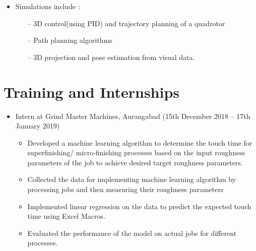 \documentclass[margin,line]{res}
\begin{document}
\begin{resume}
\begin{enumerate}
\begin{itemize}
		\item Simulations include :
		\begin{itemize}
			\item[--] 3D control(using PID) and trajectory planning of a quadrotor
			\item[--] Path planning algorithms 
			\item[--] 3D projection and pose estimation from visual data.
		\end{itemize}
	\end{itemize}
\end{enumerate}

\section{\sc Training and Internships}
\begin{itemize}
\item Intern at Grind Master Machines, Aurangabad (15th December 2018 – 17th January 2019)
\begin{itemize}
	\item Developed a machine learning algorithm to determine the touch time for superfinishing/ micro-finishing processes based 				on the input roughness parameters of the job to achieve desired target roughness parameters.
	\item Collected the data for implementing machine learning algorithm by processing jobs and then measuring their roughness 				parameters
	\item Implemented linear regression on the data to predict the expected touch time using Excel Macros.
	\item Evaluated the performance of the model on actual jobs for different processes.
\end{itemize}
\end{itemize}

\end{resume}
\end{document}
